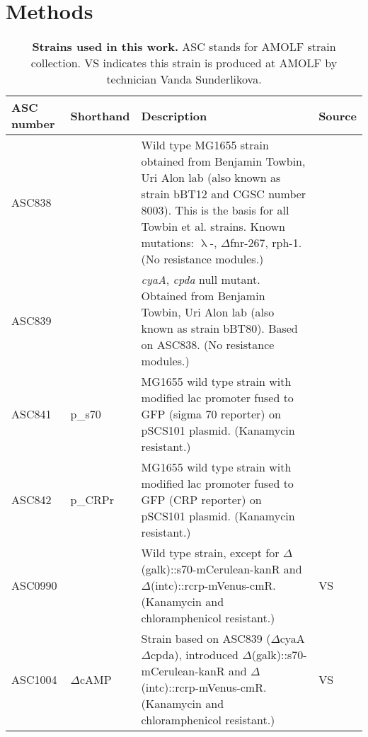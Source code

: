 \FloatBarrier
\section{Methods}



\begin{table}[h]
	\begin{tabularx}{\textwidth}{llXl}

	\textbf{ASC number}	& \textbf{Shorthand} & \textbf{Description} & \textbf{Source}		\\
	\hline
	ASC838	& 				& Wild type MG1655 strain obtained from Benjamin Towbin, Uri Alon lab (also known as strain bBT12 and CGSC number 8003). This is the basis for all Towbin et al. strains. Known mutations: $\uplambda$-, 	$\Delta$fnr-267, rph-1. (No resistance modules.) & \cite{Towbin2017}  \\
	ASC839	& 				& \textit{cyaA}, \textit{cpda} null mutant. Obtained from Benjamin Towbin, Uri Alon lab (also known as strain bBT80). Based on ASC838. (No resistance modules.) & \cite{Towbin2017}  \\
	ASC841 & 	p\_s70 & MG1655 wild type strain with modified lac promoter fused to GFP (sigma 70 reporter) on pSCS101 plasmid. (Kanamycin resistant.) & \cite{Towbin2017} \\
    ASC842 &	p\_CRPr & MG1655 wild type strain with modified lac promoter fused to GFP (CRP reporter) on pSCS101 plasmid. (Kanamycin resistant.) & \cite{Towbin2017} \\
	ASC0990  &  			& Wild type strain, except for $\Delta$(galk)::s70-mCerulean-kanR and $\Delta$(intc)::rcrp-mVenus-cmR. (Kanamycin and chloramphenicol resistant.) & VS \\
	ASC1004  & $\Delta$cAMP & Strain based on ASC839 ($\Delta$cyaA $\Delta$cpda), introduced $\Delta$(galk)::s70-mCerulean-kanR and $\Delta$(intc)::rcrp-mVenus-cmR. (Kanamycin and chloramphenicol resistant.) & VS \\
	\hline
	\end{tabularx}
	\caption{\textbf{Strains used in this work.} ASC stands for AMOLF strain collection. VS indicates this strain is produced at AMOLF by technician Vanda Sunderlikova.
    \label{table:CRP:strains}
    }
\end{table}

